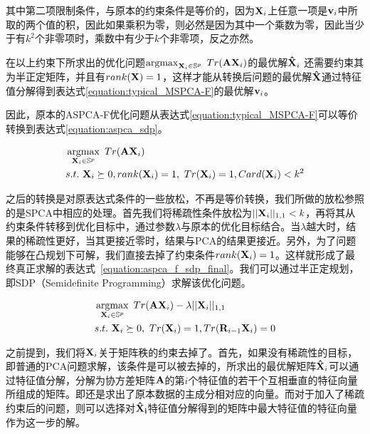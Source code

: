 其中第二项限制条件，与原本的约束条件是等价的，因为${\bf X}_i$上任意一项是${\bf v}_i$中所取的两个值的积，因此如果乘积为零，则必然是因为其中一个乘数为零，因此当少于有$k^2$个非零项时，乘数中有少于$k$个非零项，反之亦然。

在以上约束下所求出的优化问题$\operatorname*{arg max}_{{\bf X}_i \in \mathbb{S}^p}\ Tr({\bf A}{\bf X}_i)$的最优解${\bf {\hat X}}_i$ 还需要约束其为半正定矩阵，并且有$rank({\bf X})=1$，这样才能从转换后问题的最优解${\bf {\hat X}}$通过特征值分解得到表达式\ref{equation:typical_MSPCA-F}的最优解${\bf v}_i$。

因此，原本的ASPCA-F优化问题从表达式\ref{equation:typical_MSPCA-F}可以等价转换到表达式\ref{equation:aspca_sdp}。


\begin{equation}
\label{equation:aspca_sdp}
\begin{split}
 & \operatorname*{arg max}_{{\bf X}_i \in \mathbb{S}^p}\ Tr({\bf A}{\bf X}_i)\\
 & s.t.\ {\bf X}_i\succeq0, rank({\bf X}_i)=1, \ Tr({\bf X}_i)=1, Card({\bf X}_i) < k^2\\
\end{split}
\end{equation}

之后的转换是对原表达式条件的一些放松，不再是等价转换，我们所做的放松参照的是SPCA\cite{SPCA-SDP}中相应的处理。首先我们将稀疏性条件放松为$||{\bf X}_i||_{1,1}<k$，再将其从约束条件转移到优化目标中，通过参数$\lambda$与原本的优化目标结合。当$\lambda$越大时，结果的稀疏性更好，当其更接近零时，结果与PCA的结果更接近。另外，为了问题能够在凸规划下可解，我们直接去掉了约束条件$rank({\bf X}_i)=1$。这样就形成了最终真正求解的表达式~\ref{equation:aspca_f_sdp_final}。我们可以通过半正定规划，即SDP（Semidefinite Programming）求解该优化问题。

\begin{equation}
\label{equation:aspca_f_sdp_final}
\begin{split}
& \operatorname*{arg max}_{{\bf X}_i \in \mathbb{S}^p}\ Tr({\bf A}{\bf X}_i)-\lambda ||{\bf X}_i||_{1,1}\\
& s.t.\ {\bf X}_i\succeq0,\ Tr({\bf X}_i)=1, Tr({\bf R}_{i-1}{\bf X}_i)=0\\
\end{split}
\end{equation}

之前提到，我们将${\bf X}_i$关于矩阵秩的约束去掉了。首先，如果没有稀疏性的目标，即普通的PCA问题求解，该条件是可以被去掉的，所求出的最优解矩阵${\bf \hat{X}}_i$可以通过特征值分解，分解为协方差矩阵${\bf A}$的第$i$个特征值的若干个互相垂直的特征向量所组成的矩阵。即还是求出了原本数据的主成分相对应的向量。而对于加入了稀疏约束后的问题，则可以选择对${\bf \hat{X}_i}$特征值分解得到的矩阵中最大特征值的特征向量作为这一步的解。

